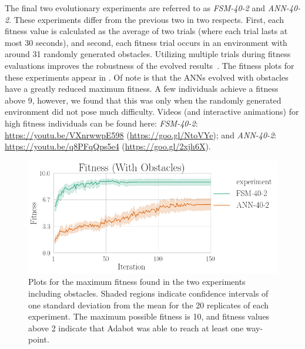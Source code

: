 The final two evolutionary experiments are referred to as \emph{FSM-40-2} and \emph{ANN-40-2}.
%
These experiments differ from the previous two in two respects. First, each fitness value is calculated as the average of two trials (where each trial lasts at most 30 seconds), and second, each fitness trial occurs in an environment with around 31 randomly generated obstacles.
%
Utilizing multiple trials during fitness evaluations improves the robustness of the evolved results~\citep{Ruud.SSCI.EvoLearn.2016}.
%
The fitness plots for these experiments appear in .
%
Of note is that the ANNs evolved with obstacles have a greatly reduced maximum fitness. A few individuals achieve a fitness above 9, however, we found that this was only when the randomly generated environment did not pose much difficulty.
%
Videos (and interactive animations) for high fitness individuals can be found here: \emph{FSM-40-2}: \url{https://youtu.be/VXnrwwpE598} (\url{https://goo.gl/NtoVYe}); and \emph{ANN-40-2}: \url{https://youtu.be/q8PFqQps5e4} (\url{https://goo.gl/2xjh6X}).
%


\begin{figure}[!ht]
    \centering

    \includegraphics[width=\columnwidth]{figures/4-results/fitness-with.png}

    \caption{Plots for the maximum fitness found in the two experiments including obstacles. Shaded regions indicate confidence intervals of one standard deviation from the mean for the 20 replicates of each experiment. The maximum possible fitness is 10, and fitness values above 2 indicate that Adabot was able to reach at least one way-point.}
    \label{fig:fitness-vs-iteration-obst}

\end{figure}



